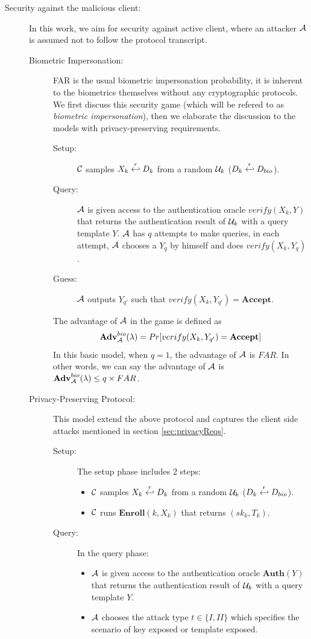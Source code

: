 \begin{description}
\item[Security against the malicious client:] In this work, we aim for security against active client, where an attacker
  $\mathcal{A}$ is assumed not to follow the protocol transcript.
  \begin{description}
  \item[Biometric Impersonation:] FAR is the usual biometric impersonation probability, it is inherent to the biometrics
    themselves without any cryptographic protocols. We first discuss this security game (which will be refered to as
    \textit{biometric impersonation}), then we elaborate the discussion to the models with privacy-preserving
    requirements.
    \begin{description}
    \item[Setup:] $\mathcal{C}$ samples $X_k \stackrel{r}{\hookleftarrow} D_{k}$ from a random $\mathcal{U}_k$ ($D_k \stackrel{r}{\hookleftarrow} D_{bio}$).
    \item[Query:] $\mathcal{A}$ is given access to the authentication oracle $verify(X_k,Y)$ that returns the
      authentication result of $\mathcal{U}_k$ with a query template $Y$. $\mathcal{A}$ has $q$ attempts to make queries, in
      each attempt, $\mathcal{A}$ chooses a $Y_{q}$ by himself and does $verify(X_k,Y_{q})$.
    \item[Guess:] $\mathcal{A}$ outputs $Y_{q'}$ such that $verify(X_k,Y_{q'}) = \textbf{Accept}$.
    \end{description}
    The advantage of $\mathcal{A}$ in the game is defined as
    \[
      \textbf{Adv}^{bio}_{\mathcal{A}}(\lambda) = Pr[verify(X_k,Y_{q'}) = \mathbf{Accept}]
    \]
    In this basic model, when $q=1$, the advantage of $\mathcal{A}$ is $FAR$.  In other words, we can say the advantage of
    $\mathcal{A}$ is $ \textbf{Adv}^{bio}_{\mathcal{A}}(\lambda) \leq q\times FAR$.

  \item[Privacy-Preserving Protocol:] This model extend the above protocol and captures the client side attacks
    mentioned in section \ref{sec:privacyReqs}.
    \begin{description}
    \item[Setup:] The setup phase includes 2 steps:
      \begin{itemize}
      \item $\mathcal{C}$ samples $X_k \stackrel{r}{\hookleftarrow} D_{k}$ from a random $\mathcal{U}_k$ ($D_k \stackrel{r}{\hookleftarrow} D_{bio}$).
      \item $\mathcal{C}$ runs $\textbf{Enroll}(k, X_k)$ that returns $(sk_k, T_k)$.
      \end{itemize}
    \item[Query:] In the query phase:
      \begin{itemize}
      \item $\mathcal{A}$ is given access to the authentication oracle $\mathbf{Auth}(Y)$ that returns the authentication
        result of $\mathcal{U}_k$ with a query template $Y$.
      \item $\mathcal{A}$ chooses the attack type $t \in \{I,II\}$ which specifies the scenario of key exposed or template
        exposed.


\end{itemize}
\end{description}
\end{description}
\end{description}
